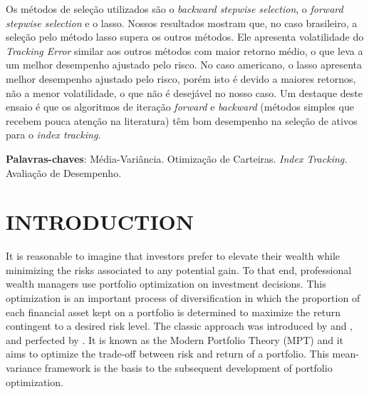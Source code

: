 \documentclass[12pt,oneside,a4paper]{memoir}
\begin{document}
Os métodos de seleção utilizados são o \textit{backward stepwise selection}, o \textit{forward stepwise selection} e o lasso.
Nossos resultados mostram que, no caso brasileiro, a seleção pelo método lasso supera os outros métodos.
Ele apresenta volatilidade do \textit{Tracking Error} similar aos outros métodos com maior retorno médio, o que leva a um melhor desempenho ajustado pelo risco.
No caso americano, o lasso apresenta melhor desempenho ajustado pelo risco, porém isto é devido a maiores retornos, não a menor volatilidade, o que não é desejável no nosso caso.
Um destaque deste ensaio é que os algoritmos de iteração \textit{forward} e \textit{backward} (métodos simples que recebem pouca atenção na literatura) têm bom desempenho na seleção de ativos para o \textit{index tracking}.

\noindent 
\textbf{Palavras-chaves}: Média-Variância. Otimização de Carteiras. \textit{Index Tracking.} Avaliação de Desempenho.


\cleardoublepage
\listoffigures*


\cleardoublepage
\listoftables*


\cleardoublepage
\tableofcontents*
\cleardoublepage

\textual

\setcounter{page}{10} 

\chapter{INTRODUCTION}

It is reasonable to imagine that investors prefer to elevate their wealth while minimizing the risks associated to any potential gain.
To that end, professional wealth managers use portfolio optimization on investment decisions.
This optimization is an important process of diversification in which the proportion of each financial asset kept on a portfolio is determined to maximize the return contingent to a desired risk level.
The classic approach was introduced by  and , and perfected by .
It is known as the Modern Portfolio Theory (MPT) and it aims to optimize the trade-off between risk and return of a portfolio.
This mean-variance framework is the basis to the subsequent development of portfolio optimization.
\end{document}
